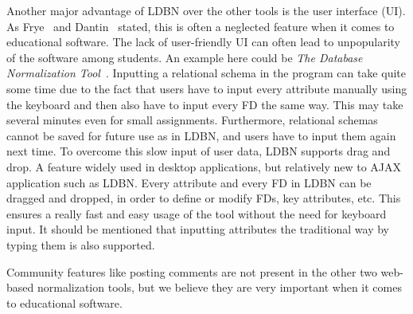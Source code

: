Another major advantage of LDBN over the other tools is the user interface (UI). 
As Frye~\cite{p10} and Dantin~\cite{p9} stated, this is often a
neglected feature when it comes to educational software. The lack of user-friendly UI 
can often lead to unpopularity of the software among students. An example here could be 
\textit{The Database Normalization Tool}~\cite{w1}. Inputting a relational schema in the program can
take quite some time due to the fact that
users have to input every attribute manually using the keyboard and then also 
have to input every FD the same way. This may take several minutes even for small  
assignments. Furthermore, relational schemas cannot be saved for future use as 
in LDBN, and users have to input them again next time. To overcome this slow input of user data, 
LDBN supports drag and drop. A feature widely used in desktop
applications, but relatively new to AJAX application such as LDBN. Every attribute
and every FD in LDBN can be dragged and dropped, in order 
to define or modify FDs, key attributes, etc. This ensures a really fast and easy
usage of the tool without the need for keyboard input. It should be mentioned
that inputting attributes the traditional way by typing them is also supported.

Community features like posting comments are not present in the other two web-based 
normalization tools, but we believe they are very important when it comes to educational
software. 

